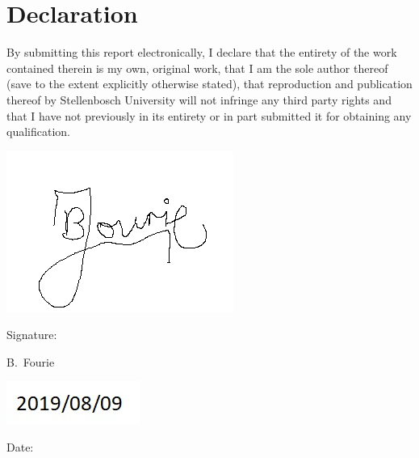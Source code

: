 \chapter{Declaration}

By submitting this report electronically, I declare that the entirety of the work contained
therein is my own, original work, that I am the sole author thereof (save to the extent
explicitly otherwise stated), that reproduction and publication thereof by Stellenbosch
University will not infringe any third party rights and that I have not previously in its
entirety or in part submitted it for obtaining any qualification.

\vspace{3cm}

\includegraphics{./Figures/Signature.png}\\     
\noindent%
\parbox{.5\textwidth}{%
  Signature:\quad\dotfill\par
  \hfill B.\ Fourie\hspace{1.2cm}\null}


\vspace{1.5cm}
\hspace{1.5cm}\includegraphics{./Figures/Date.jpg}\\  
\noindent%
\parbox{.5\textwidth}{%
  Date:\quad\dotfill\par}
